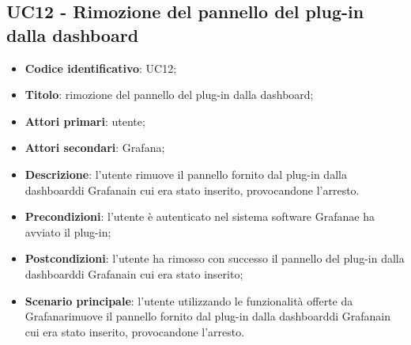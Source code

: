 \subsection{UC12 - Rimozione del pannello del plug-in dalla dashboard}
\begin{itemize}
    \item \textbf{Codice identificativo}: UC12;
    \item \textbf{Titolo}: rimozione del pannello del plug-in dalla dashboard\glo;
    \item \textbf{Attori primari}: utente;
    \item \textbf{Attori secondari}: Grafana\glo;
    \item \textbf{Descrizione}: l'utente rimuove il pannello fornito dal plug-in dalla dashboard\glosp di Grafana\glosp in cui era stato inserito, provocandone l'arresto.
    \item \textbf{Precondizioni}: l'utente è autenticato nel sistema software Grafana\glosp e ha avviato il plug-in;
    \item \textbf{Postcondizioni}: l'utente ha rimosso con successo il pannello del plug-in dalla dashboard\glosp di Grafana\glo in cui era stato inserito;
    \item \textbf{Scenario principale}: l'utente utilizzando le funzionalità offerte da Grafana\glosp rimuove il pannello fornito dal plug-in dalla dashboard\glosp di Grafana\glosp in cui era stato inserito, provocandone l'arresto.
\end{itemize}
